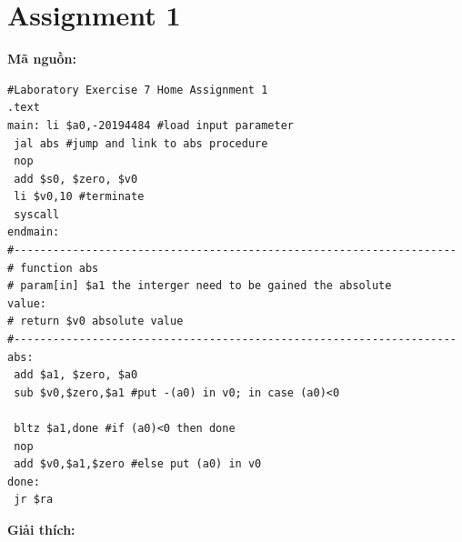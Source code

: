 \documentclass[12pt,a4paper,oneside]{article}
\begin{document}
\section*{Assignment 1}
\textbf{Mã nguồn:}
\begin{center}
\begin{lstlisting}
#Laboratory Exercise 7 Home Assignment 1
.text
main: li $a0,-20194484 #load input parameter 
 jal abs #jump and link to abs procedure
 nop
 add $s0, $zero, $v0
 li $v0,10 #terminate
 syscall 
endmain:
#--------------------------------------------------------------------
# function abs
# param[in] $a1 the interger need to be gained the absolute 
value: 
# return $v0 absolute value
#--------------------------------------------------------------------
abs:
 add $a1, $zero, $a0
 sub $v0,$zero,$a1 #put -(a0) in v0; in case (a0)<0
 
 bltz $a1,done #if (a0)<0 then done
 nop
 add $v0,$a1,$zero #else put (a0) in v0
done:
 jr $ra
\end{lstlisting}
\end{center}
\textbf{Giải thích:}
\end{document}
